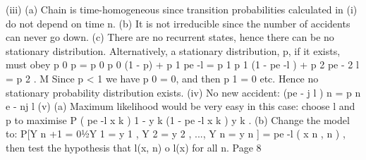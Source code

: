 (iii)
(a) Chain is time-homogeneous since transition probabilities calculated in (i) do not depend on time n.
(b) It is not irreducible since the number of accidents can never go down.
(c) There are no recurrent states, hence there can be no stationary distribution. Alternatively, a stationary distribution, p, if it exists,
must obey
p 0 p = p 0
p 0 (1 - p) + p 1 pe -l = p 1
p 1 (1 - pe -l ) + p 2 pe - 2 l = p 2 .
M
Since p < 1 we have p 0 = 0, and then p 1 = 0 etc. Hence no
stationary probability distribution exists.
(iv)
No new accident:
(pe - j l ) n = p n e - nj l
(v)
(a) Maximum likelihood would be very easy in this case: choose l and
p to maximise P {( pe -l x k ) 1 - y k (1 - pe -l x k ) y k }.
(b) Change the model to:
P[Y n +1 = 01⁄2Y 1 = y 1 , Y 2 = y 2 , ..., Y n = y n ] = pe -l ( x n , n ) ,
then test the hypothesis that l(x, n) o l(x) for all n.
Page 8

